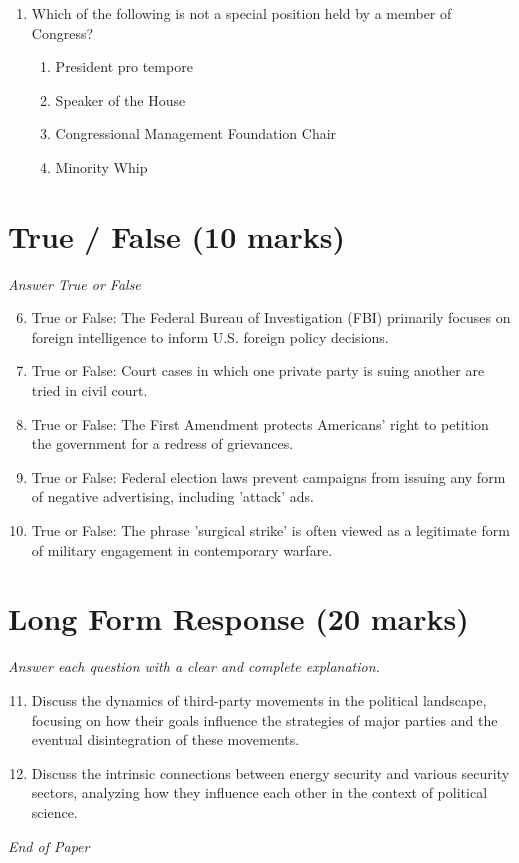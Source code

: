 \documentclass[12pt]{article}
\begin{document}
\begin{enumerate}[label=\arabic*.]
\begin{enumerate}[label=(\alph*)]
    \item A more cooperative international system.
    \item A more competitive international system.
    \item An increase in inter-state alliances and military restraint.
\end{enumerate}
\item Which of the following is not a special position held by a member of Congress?
\begin{enumerate}[label=(\alph*)]
    \item President pro tempore
    \item Speaker of the House
    \item Congressional Management Foundation Chair
    \item Minority Whip
\end{enumerate}
\end{enumerate}

\section*{True / False (10 marks)}
\textit{Answer True or False}
\begin{enumerate}[label=\arabic*.]
\setcounter{enumi}{5}
\item True or False: The Federal Bureau of Investigation (FBI) primarily focuses on foreign intelligence to inform U.S. foreign policy decisions.
\item True or False: Court cases in which one private party is suing another are tried in civil court.
\item True or False: The First Amendment protects Americans' right to petition the government for a redress of grievances.
\item True or False: Federal election laws prevent campaigns from issuing any form of negative advertising, including 'attack' ads.
\item True or False: The phrase 'surgical strike' is often viewed as a legitimate form of military engagement in contemporary warfare.
\end{enumerate}

\section*{Long Form Response (20 marks)}
\textit{Answer each question with a clear and complete explanation.}
\begin{enumerate}[label=\arabic*.]
\setcounter{enumi}{10}
\item Discuss the dynamics of third-party movements in the political landscape, focusing on how their goals influence the strategies of major parties and the eventual disintegration of these movements.
\item Discuss the intrinsic connections between energy security and various security sectors, analyzing how they influence each other in the context of political science.
\end{enumerate}

\vfill
\noindent\textit{End of Paper}
\end{document}
